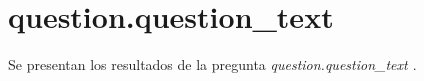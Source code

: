 \documentclass{article}
\begin{document}
  \section{ {{ question.question_text }} }

  Se presentan los resultados de la pregunta\emph{ {{ question.question_text }} }.

\end{document}
